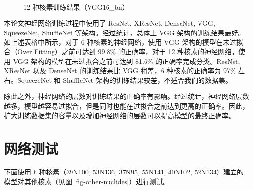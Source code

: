 \documentclass[AutoFakeBold]{LZUThesis}
\begin{document}
\begin{figure}[H]
	\centering
	\\	
    \caption{12 种核素训练结果（VGG16\_bn）}
    \label{fig_learn12-vgg16-bn}
\end{figure}


本论文神经网络训练过程中使用了 ResNet, XResNet, DenseNet, VGG, SqueezeNet, ShuffleNet 等架构。经过统计，总体上 VGG 架构的训练结果最好。如上述表格中所示，对于 6 种核素的神经网络，使用 VGG 架构的模型在未过拟合（Over Fitting）之前可达到 99.8\% 的正确率，对于 12 种核素的神经网络，使用 VGG 架构的模型在未过拟合之前可达到 81.6\% 的正确率完成分类。ResNet, XResNet 以及 DenseNet 的训练结果比 VGG 稍差，6 种核素的正确率为 97\% 左右。SqueezeNet 和 ShuffleNet 架构的训练结果较差，不适合我们的数据集。

除此之外，神经网络的层数对训练结果的正确率有影响。经过统计，神经网络层数越多，模型越容易过拟合，但是同时也能在过拟合之前达到更高的正确率。因此，扩大训练数据集的容量以及增加神经网络的层数可以提高模型的最终正确率。



\section{网络测试}
下面使用 6 种核素（39N100, 53N136, 37N95, 55N141, 40N102, 52N134）建立的模型对其他核素（见图 \ref{fig-other-nuclides}）进行测试。
\end{document}
